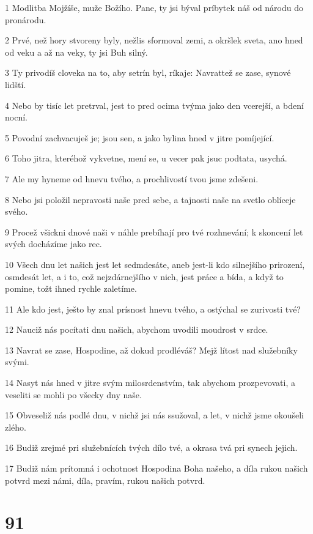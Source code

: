 \par 1 Modlitba Mojžíše, muže Božího. Pane, ty jsi býval príbytek náš od národu do pronárodu.
\par 2 Prvé, než hory stvoreny byly, nežlis sformoval zemi, a okršlek sveta, ano hned od veku a až na veky, ty jsi Buh silný.
\par 3 Ty privodíš cloveka na to, aby setrín byl, ríkaje: Navrattež se zase, synové lidští.
\par 4 Nebo by tisíc let pretrval, jest to pred ocima tvýma jako den vcerejší, a bdení nocní.
\par 5 Povodní zachvacuješ je; jsou sen, a jako bylina hned v jitre pomíjející.
\par 6 Toho jitra, kteréhož vykvetne, mení se, u vecer pak jsuc podtata, usychá.
\par 7 Ale my hyneme od hnevu tvého, a prochlivostí tvou jsme zdešeni.
\par 8 Nebo jsi položil nepravosti naše pred sebe, a tajnosti naše na svetlo oblíceje svého.
\par 9 Procež všickni dnové naši v náhle prebíhají pro tvé rozhnevání; k skoncení let svých docházíme jako rec.
\par 10 Všech dnu let našich jest let sedmdesáte, aneb jest-li kdo silnejšího prirození, osmdesát let, a i to, což nejzdárnejšího v nich, jest práce a bída, a když to pomine, tožt ihned rychle zaletíme.
\par 11 Ale kdo jest, ješto by znal prísnost hnevu tvého, a ostýchal se zurivosti tvé?
\par 12 Nauciž nás pocítati dnu našich, abychom uvodili moudrost v srdce.
\par 13 Navrat se zase, Hospodine, až dokud prodléváš? Mejž lítost nad služebníky svými.
\par 14 Nasyt nás hned v jitre svým milosrdenstvím, tak abychom prozpevovati, a veseliti se mohli po všecky dny naše.
\par 15 Obveseliž nás podlé dnu, v nichž jsi nás ssužoval, a let, v nichž jsme okoušeli zlého.
\par 16 Budiž zrejmé pri služebnících tvých dílo tvé, a okrasa tvá pri synech jejich.
\par 17 Budiž nám prítomná i ochotnost Hospodina Boha našeho, a díla rukou našich potvrd mezi námi, díla, pravím, rukou našich potvrd.

\chapter{91}

